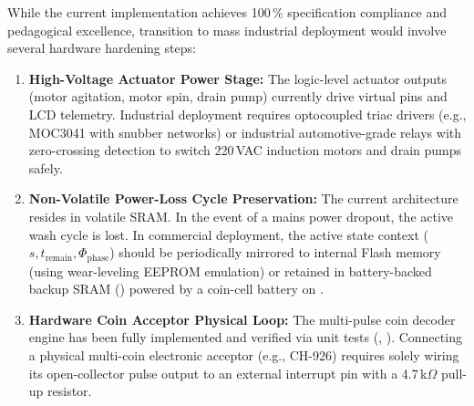 While the current implementation achieves 100\,\% specification compliance and pedagogical excellence, transition to mass industrial deployment would involve several hardware hardening steps:
\begin{enumerate}
  \item \textbf{High-Voltage Actuator Power Stage:}
        The logic-level actuator outputs (motor agitation, motor spin, drain pump) currently drive virtual pins and LCD telemetry. Industrial deployment requires optocoupled triac drivers (e.g., MOC3041 with snubber networks) or industrial automotive-grade relays with zero-crossing detection to switch 220\,VAC induction motors and drain pumps safely.
  \item \textbf{Non-Volatile Power-Loss Cycle Preservation:}
        The current architecture resides in volatile SRAM. In the event of a mains power dropout, the active wash cycle is lost. In commercial deployment, the active state context ($s, t_{\text{remain}}, \Phi_{\text{phase}}$) should be periodically mirrored to internal Flash memory (using wear-leveling EEPROM emulation) or retained in battery-backed backup SRAM () powered by a coin-cell battery on .
  \item \textbf{Hardware Coin Acceptor Physical Loop:}
        The multi-pulse coin decoder engine has been fully implemented and verified via unit tests (, ). Connecting a physical multi-coin electronic acceptor (e.g., CH-926) requires solely wiring its open-collector pulse output to an external interrupt pin with a 4.7\,k$\Omega$ pull-up resistor.
\end{enumerate}
